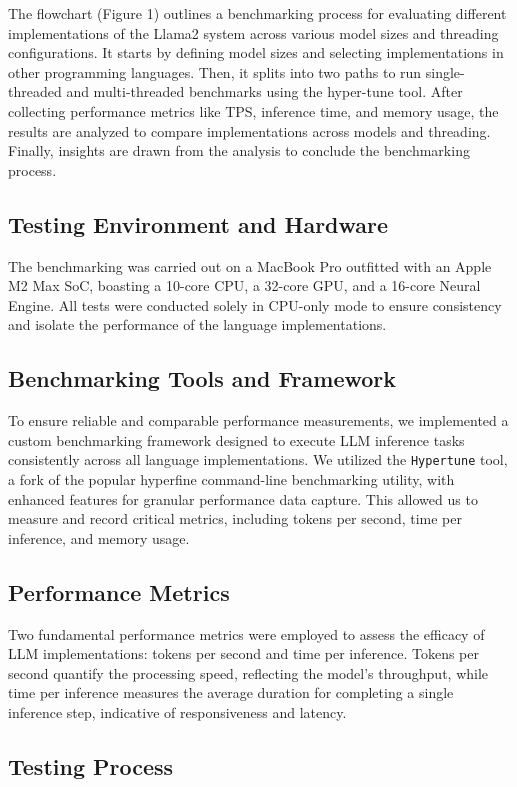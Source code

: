 \documentclass[conference]{IEEEtran}
\begin{document}
The flowchart (Figure 1) outlines a benchmarking process for evaluating different implementations of the Llama2 system across various model sizes and threading configurations. It starts by defining model sizes and selecting implementations in other programming languages. Then, it splits into two paths to run single-threaded and multi-threaded benchmarks using the hyper-tune tool. After collecting performance metrics like TPS, inference time, and memory usage, the results are analyzed to compare implementations across models and threading. Finally, insights are drawn from the analysis to conclude the benchmarking process.

\subsection{Testing Environment and Hardware}
The benchmarking was carried out on a MacBook Pro outfitted with an Apple M2 Max SoC, boasting a 10-core CPU, a 32-core GPU, and a 16-core Neural Engine. All tests were conducted solely in CPU-only mode to ensure consistency and isolate the performance of the language implementations.

\subsection{Benchmarking Tools and Framework}
To ensure reliable and comparable performance measurements, we implemented a custom benchmarking framework designed to execute LLM inference tasks consistently across all language implementations. We utilized the \texttt{Hypertune} tool, a fork of the popular hyperfine command-line benchmarking utility, with enhanced features for granular performance data capture. This allowed us to measure and record critical metrics, including tokens per second, time per inference, and memory usage.

\subsection{Performance Metrics}
Two fundamental performance metrics were employed to assess the efficacy of LLM implementations: tokens per second and time per inference. Tokens per second quantify the processing speed, reflecting the model’s throughput, while time per inference measures the average duration for completing a single inference step, indicative of responsiveness and latency.

\subsection{Testing Process}
\end{document}
